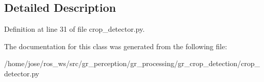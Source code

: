 \subsection{Detailed Description}


Definition at line 31 of file crop\+\_\+detector.\+py.



The documentation for this class was generated from the following file\+:\begin{DoxyCompactItemize}
\item 
/home/jose/ros\+\_\+ws/src/gr\+\_\+perception/gr\+\_\+processing/gr\+\_\+crop\+\_\+detection/crop\+\_\+detector.\+py\end{DoxyCompactItemize}
